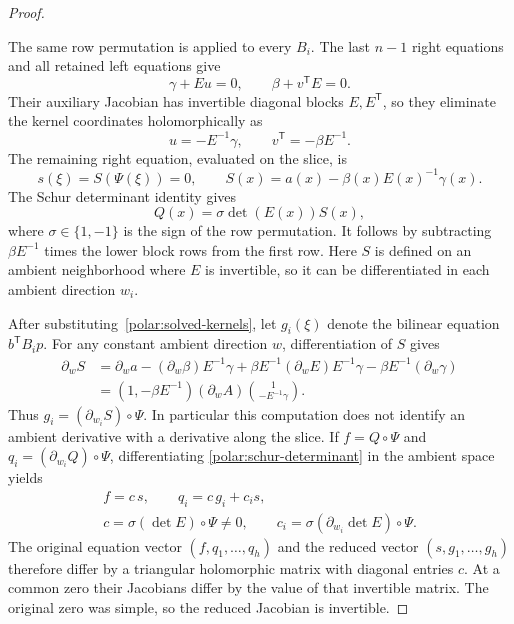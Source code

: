 \begin{proof}
\begin{samepage}
\end{samepage}
The same row permutation is applied to every $B_i$. The last $n-1$ right
equations and all retained left equations give
\[
 \gamma+Eu=0,\qquad \beta+v^{\mathsf T}E=0.
\]
Their auxiliary Jacobian has invertible diagonal blocks $E,E^{\mathsf T}$,
so they eliminate the kernel coordinates holomorphically as
\begin{equation}\label{polar:solved-kernels}
 u=-E^{-1}\gamma,\qquad v^{\mathsf T}=-\beta E^{-1}.
\end{equation}
The remaining right equation, evaluated on the slice, is
\[
 s(\xi)=S(\Psi(\xi))=0,
 \qquad S(x)=a(x)-\beta(x)E(x)^{-1}\gamma(x).
\]
The Schur determinant identity gives
\begin{equation}\label{polar:schur-determinant}
 Q(x)=\sigma\det(E(x))S(x),
\end{equation}
where $\sigma\in\{1,-1\}$ is the sign of the row permutation. It follows
by subtracting $\beta E^{-1}$ times the lower block rows from the first
row. Here $S$ is defined on an ambient neighborhood where $E$ is
invertible, so it can be differentiated in each ambient direction $w_i$.

After substituting~\eqref{polar:solved-kernels}, let
$g_i(\xi)$ denote the bilinear equation $b^{\mathsf T}B_i p$.
For any constant ambient direction $w$, differentiation of $S$ gives
\begin{align*}
 \partial_w S
 &=\partial_w a-(\partial_w\beta)E^{-1}\gamma
       +\beta E^{-1}(\partial_w E)E^{-1}\gamma
       -\beta E^{-1}(\partial_w\gamma)\\
 &=(1,-\beta E^{-1})(\partial_w A)
                 \binom{1}{-E^{-1}\gamma}.
\end{align*}
Thus $g_i=(\partial_{w_i}S)\circ\Psi$. In particular this computation
does not identify an ambient derivative with a derivative along the slice.
If $f=Q\circ\Psi$ and $q_i=(\partial_{w_i}Q)\circ\Psi$, differentiating
\eqref{polar:schur-determinant} in the ambient space yields
\begin{equation}\label{polar:reduced-system}
 \begin{gathered}
 f=c\,s,\qquad q_i=c\,g_i+c_i s,\\
 c=\sigma(\det E)\circ\Psi\ne0,\qquad
 c_i=\sigma(\partial_{w_i}\det E)\circ\Psi.
 \end{gathered}
\end{equation}
The original equation vector $(f,q_1,\ldots,q_h)$ and the reduced vector
$(s,g_1,\ldots,g_h)$ therefore differ by a triangular holomorphic matrix
with diagonal entries $c$. At a common zero their Jacobians differ by
the value of that invertible matrix. The original zero was simple, so
the reduced Jacobian is invertible.


\end{proof}
